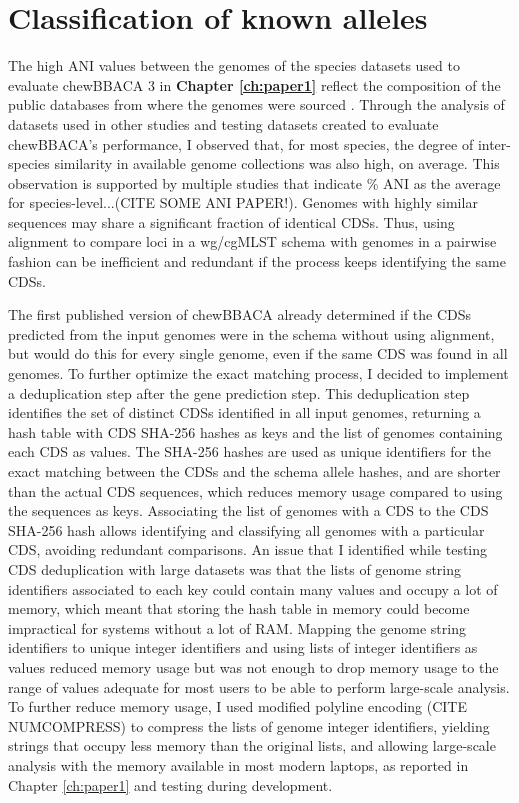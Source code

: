 \section{Classification of known alleles}

The high \ac{ANI} values between the genomes of the species datasets used to evaluate chewBBACA 3 in \textbf{Chapter \ref{ch:paper1}} reflect the composition of the public databases from where the genomes were sourced \cite{oleary_reference_2016, blackwell_exploring_2021}. Through the analysis of datasets used in other studies and testing datasets created to evaluate chewBBACA's performance, I observed that, for most species, the degree of inter-species similarity in available genome collections was also high, on average. This observation is supported by multiple studies that indicate \% ANI as the average for species-level...(CITE SOME ANI PAPER!). Genomes with highly similar sequences may share a significant fraction of identical \ac{CDSs}. Thus, using alignment to compare loci in a wg/cgMLST schema with genomes in a pairwise fashion can be inefficient and redundant if the process keeps identifying the same \ac{CDSs}.

The first published version of chewBBACA already determined if the \ac{CDSs} predicted from the input genomes were in the schema without using alignment, but would do this for every single genome, even if the same \ac{CDS} was found in all genomes. To further optimize the exact matching process, I decided to implement a deduplication step after the gene prediction step. This deduplication step identifies the set of distinct \ac{CDSs} identified in all input genomes, returning a hash table with \ac{CDS} SHA-256 hashes as keys and the list of genomes containing each \ac{CDS} as values. The SHA-256 hashes are used as unique identifiers for the exact matching between the \ac{CDSs} and the schema allele hashes, and are shorter than the actual \ac{CDS} sequences, which reduces memory usage compared to using the sequences as keys. Associating the list of genomes with a \ac{CDS} to the \ac{CDS} SHA-256 hash allows identifying and classifying all genomes with a particular \ac{CDS}, avoiding redundant comparisons. An issue that I identified while testing \ac{CDS} deduplication with large datasets was that the lists of genome string identifiers associated to each key could contain many values and occupy a lot of memory, which meant that storing the hash table in memory could become impractical for systems without a lot of \ac{RAM}. Mapping the genome string identifiers to unique integer identifiers and using lists of integer identifiers as values reduced memory usage but was not enough to drop memory usage to the range of values adequate for most users to be able to perform large-scale analysis. To further reduce memory usage, I used modified polyline encoding (CITE NUMCOMPRESS) to compress the lists of genome integer identifiers, yielding strings that occupy less memory than the original lists, and allowing large-scale analysis with the memory available in most modern laptops, as reported in Chapter \ref{ch:paper1} and testing during development.


